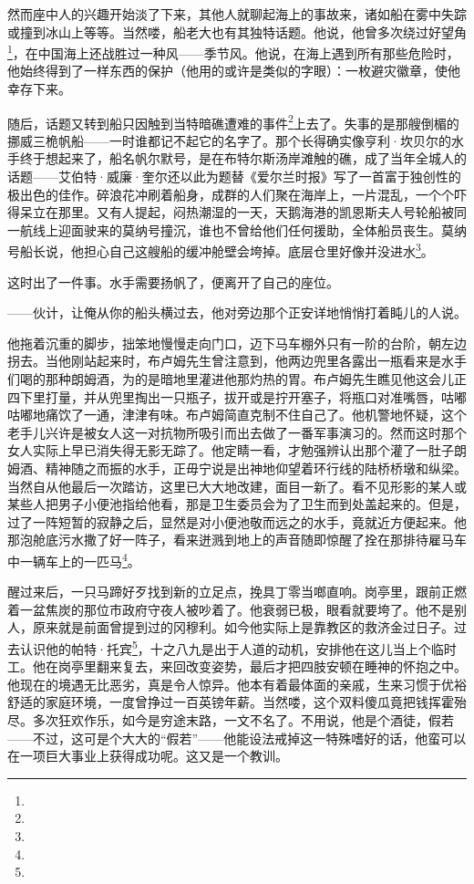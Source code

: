 \par 然而座中人的兴趣开始淡了下来，其他人就聊起海上的事故来，诸如船在雾中失踪或撞到冰山上等等。当然喽，船老大也有其独特话题。他说，他曾多次绕过好望角\footnote{}，在中国海上还战胜过一种风——季节风。他说，在海上遇到所有那些危险时，他始终得到了一样东西的保护（他用的或许是类似的字眼）：一枚避灾徽章，使他幸存下来。
\par 随后，话题又转到船只因触到当特暗礁遭难的事件\footnote{}上去了。失事的是那艘倒楣的挪威三桅帆船——一时谁都记不起它的名字了。那个长得确实像亨利·坎贝尔的水手终于想起来了，船名帆尔默号，是在布特尔斯汤岸滩触的礁，成了当年全城人的话题——艾伯特·威廉·奎尔还以此为题替《爱尔兰时报》写了一首富于独创性的极出色的佳作。碎浪花冲刷着船身，成群的人们聚在海岸上，一片混乱，一个个吓得呆立在那里。又有人提起，闷热潮湿的一天，天鹅海港的凯恩斯夫人号轮船被同一航线上迎面驶来的莫纳号撞沉，谁也不曾给他们任何援助，全体船员丧生。莫纳号船长说，他担心自己这艘船的缓冲舱壁会垮掉。底层仓里好像并没进水\footnote{}。
\par 这时出了一件事。水手需要扬帆了，便离开了自己的座位。
\par ——伙计，让俺从你的船头横过去，他对旁边那个正安详地悄悄打着盹儿的人说。
\par 他拖着沉重的脚步，拙笨地慢慢走向门口，迈下马车棚外只有一阶的台阶，朝左边拐去。当他刚站起来时，布卢姆先生曾注意到，他两边兜里各露出一瓶看来是水手们喝的那种朗姆酒，为的是暗地里灌进他那灼热的胃。布卢姆先生瞧见他这会儿正四下里打量，并从兜里掏出一只瓶子，拔开或是拧开塞子，将瓶口对准嘴唇，咕嘟咕嘟地痛饮了一通，津津有味。布卢姆简直克制不住自己了。他机警地怀疑，这个老手儿兴许是被女人这一对抗物所吸引而出去做了一番军事演习的。然而这时那个女人实际上早已消失得无影无踪了。他定睛一看，才勉强辨认出那个灌了一肚子朗姆酒、精神随之而振的水手，正毋宁说是出神地仰望着环行线的陆桥桥墩和纵梁。当然自从他最后一次踏访，这里已大大地改建，面目一新了。看不见形影的某人或某些人把男子小便池指给他看，那是卫生委员会为了卫生而到处盖起来的。但是，过了一阵短暂的寂静之后，显然是对小便池敬而远之的水手，竟就近方便起来。他那泡舱底污水撒了好一阵子，看来迸溅到地上的声音随即惊醒了拴在那排待雇马车中一辆车上的一匹马\footnote{}。
\par 醒过来后，一只马蹄好歹找到新的立足点，挽具丁零当啷直响。岗亭里，跟前正燃着一盆焦炭的那位市政府守夜人被吵着了。他衰弱已极，眼看就要垮了。他不是别人，原来就是前面曾提到过的冈穆利。如今他实际上是靠教区的救济金过日子。过去认识他的帕特·托宾\footnote{}，十之八九是出于人道的动机，安排他在这儿当上个临时工。他在岗亭里翻来复去，来回改变姿势，最后才把四肢安顿在睡神的怀抱之中。他现在的境遇无比恶劣，真是令人惊异。他本有着最体面的亲戚，生来习惯于优裕舒适的家庭环境，一度曾挣过一百英镑年薪。当然喽，这个双料傻瓜竟把钱挥霍殆尽。多次狂欢作乐，如今是穷途末路，一文不名了。不用说，他是个酒徒，假若——不过，这可是个大大的“假若”——他能设法戒掉这一特殊嗜好的话，他蛮可以在一项巨大事业上获得成功呢。这又是一个教训。
